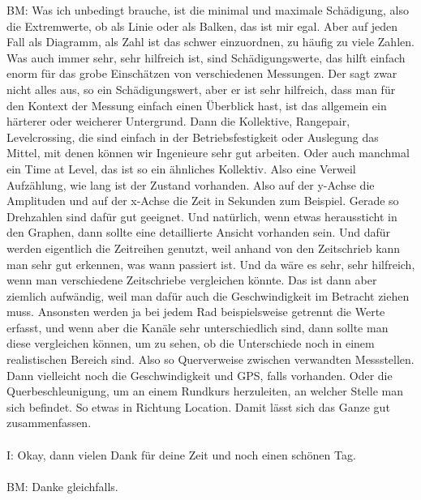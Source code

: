 \begin{linenumbers}
BM: Was ich unbedingt brauche, ist die minimal und maximale Schädigung, also die Extremwerte, ob als Linie oder als Balken, das ist mir egal. Aber auf jeden Fall als Diagramm, als Zahl ist das schwer einzuordnen, zu häufig zu viele Zahlen. Was auch immer sehr, sehr hilfreich ist, sind Schädigungswerte, das hilft einfach enorm für das grobe Einschätzen von verschiedenen Messungen. Der sagt zwar nicht alles aus, so ein Schädigungswert, aber er ist sehr hilfreich, dass man für den Kontext der Messung einfach einen Überblick hast, ist das allgemein ein härterer oder weicherer Untergrund. Dann die Kollektive, Rangepair, Levelcrossing, die sind einfach in der Betriebsfestigkeit oder Auslegung das Mittel, mit denen können wir Ingenieure sehr gut arbeiten. Oder auch manchmal ein Time at Level, das ist so ein ähnliches Kollektiv. Also eine Verweil Aufzählung, wie lang ist der Zustand vorhanden. Also auf der y-Achse die Amplituden und auf der x-Achse die Zeit in Sekunden zum Beispiel. Gerade so Drehzahlen sind dafür gut geeignet. Und natürlich, wenn etwas heraussticht in den Graphen, dann sollte eine detaillierte Ansicht vorhanden sein. Und dafür werden eigentlich die Zeitreihen genutzt, weil anhand von den Zeitschrieb kann man sehr gut erkennen, was wann passiert ist. Und da wäre es sehr, sehr hilfreich, wenn man verschiedene Zeitschriebe vergleichen könnte. Das ist dann aber ziemlich aufwändig, weil man dafür auch die Geschwindigkeit im Betracht ziehen muss. Ansonsten werden ja bei jedem Rad beispielsweise getrennt die Werte erfasst, und wenn aber die Kanäle sehr unterschiedlich sind, dann sollte man diese vergleichen können, um zu sehen, ob die Unterschiede noch in einem realistischen Bereich sind. Also so Querverweise zwischen verwandten Messstellen. Dann vielleicht noch die Geschwindigkeit und GPS, falls vorhanden. Oder die Querbeschleunigung, um an einem Rundkurs herzuleiten, an welcher Stelle man sich befindet. So etwas in Richtung Location. Damit lässt sich das Ganze gut zusammenfassen.\\\\
I: Okay, dann vielen Dank für deine Zeit und noch einen schönen Tag.\\\\
BM: Danke gleichfalls.
\end{linenumbers}
